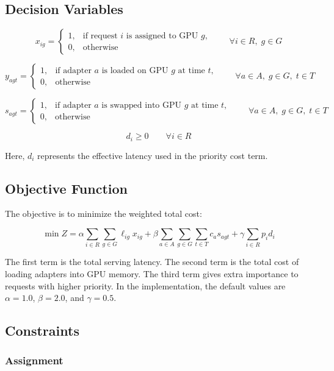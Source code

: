 \documentclass[12pt]{article}
\begin{document}
\subsection{Decision Variables}

\[
x_{ig} =
\begin{cases}
1, & \text{if request } i \text{ is assigned to GPU } g,\\
0, & \text{otherwise}
\end{cases}
\qquad \forall i \in R,\; g \in G
\]

\[
y_{agt} =
\begin{cases}
1, & \text{if adapter } a \text{ is loaded on GPU } g \text{ at time } t,\\
0, & \text{otherwise}
\end{cases}
\qquad \forall a \in A,\; g \in G,\; t \in T
\]

\[
s_{agt} =
\begin{cases}
1, & \text{if adapter } a \text{ is swapped into GPU } g \text{ at time } t,\\
0, & \text{otherwise}
\end{cases}
\qquad \forall a \in A,\; g \in G,\; t \in T
\]

\[
d_i \geq 0
\qquad \forall i \in R
\]

Here, $d_i$ represents the effective latency used in the priority cost term.

\subsection{Objective Function}

The objective is to minimize the weighted total cost:

\[
\min Z =
\alpha \sum_{i \in R} \sum_{g \in G} \ell_{ig} x_{ig}
+ \beta \sum_{a \in A} \sum_{g \in G} \sum_{t \in T} c_a s_{agt}
+ \gamma \sum_{i \in R} p_i d_i
\]

The first term is the total serving latency. The second term is the total cost
of loading adapters into GPU memory. The third term gives extra importance to
requests with higher priority. In the implementation, the default values are
$\alpha = 1.0$, $\beta = 2.0$, and $\gamma = 0.5$.

\subsection{Constraints}

\subsubsection*{Assignment}
\end{document}

